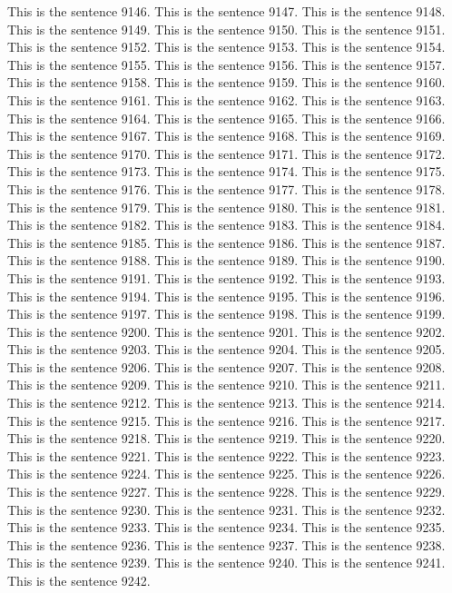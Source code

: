 \documentclass{article}
\begin{document}
This is the sentence 9146.
This is the sentence 9147.
This is the sentence 9148.
This is the sentence 9149.
This is the sentence 9150.
This is the sentence 9151.
This is the sentence 9152.
This is the sentence 9153.
This is the sentence 9154.
This is the sentence 9155.
This is the sentence 9156.
This is the sentence 9157.
This is the sentence 9158.
This is the sentence 9159.
This is the sentence 9160.
This is the sentence 9161.
This is the sentence 9162.
This is the sentence 9163.
This is the sentence 9164.
This is the sentence 9165.
This is the sentence 9166.
This is the sentence 9167.
This is the sentence 9168.
This is the sentence 9169.
This is the sentence 9170.
This is the sentence 9171.
This is the sentence 9172.
This is the sentence 9173.
This is the sentence 9174.
This is the sentence 9175.
This is the sentence 9176.
This is the sentence 9177.
This is the sentence 9178.
This is the sentence 9179.
This is the sentence 9180.
This is the sentence 9181.
This is the sentence 9182.
This is the sentence 9183.
This is the sentence 9184.
This is the sentence 9185.
This is the sentence 9186.
This is the sentence 9187.
This is the sentence 9188.
This is the sentence 9189.
This is the sentence 9190.
This is the sentence 9191.
This is the sentence 9192.
This is the sentence 9193.
This is the sentence 9194.
This is the sentence 9195.
This is the sentence 9196.
This is the sentence 9197.
This is the sentence 9198.
This is the sentence 9199.
This is the sentence 9200.
This is the sentence 9201.
This is the sentence 9202.
This is the sentence 9203.
This is the sentence 9204.
This is the sentence 9205.
This is the sentence 9206.
This is the sentence 9207.
This is the sentence 9208.
This is the sentence 9209.
This is the sentence 9210.
This is the sentence 9211.
This is the sentence 9212.
This is the sentence 9213.
This is the sentence 9214.
This is the sentence 9215.
This is the sentence 9216.
This is the sentence 9217.
This is the sentence 9218.
This is the sentence 9219.
This is the sentence 9220.
This is the sentence 9221.
This is the sentence 9222.
This is the sentence 9223.
This is the sentence 9224.
This is the sentence 9225.
This is the sentence 9226.
This is the sentence 9227.
This is the sentence 9228.
This is the sentence 9229.
This is the sentence 9230.
This is the sentence 9231.
This is the sentence 9232.
This is the sentence 9233.
This is the sentence 9234.
This is the sentence 9235.
This is the sentence 9236.
This is the sentence 9237.
This is the sentence 9238.
This is the sentence 9239.
This is the sentence 9240.
This is the sentence 9241.
This is the sentence 9242.
\end{document}
